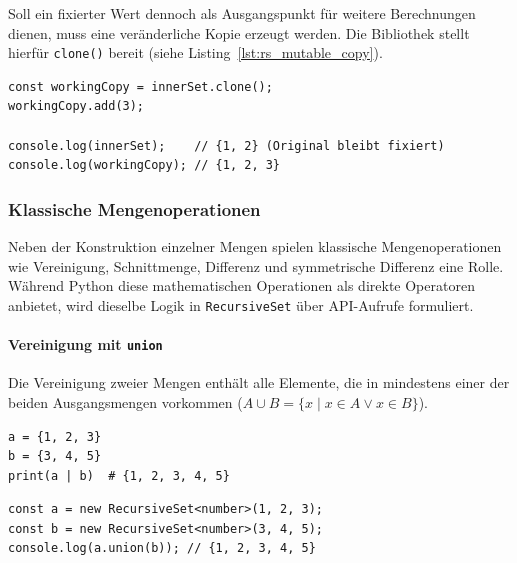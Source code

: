 Soll ein fixierter Wert dennoch als Ausgangspunkt für weitere Berechnungen dienen, muss eine veränderliche Kopie erzeugt werden. Die Bibliothek stellt hierfür \texttt{clone()} bereit (siehe Listing~\ref{lst:rs_mutable_copy}). 

\begin{listing}[ht]
    \caption{Arbeiten mit einer veränderlichen Kopie}
    \label{lst:rs_mutable_copy}
    \begin{verbatim}
const workingCopy = innerSet.clone();
workingCopy.add(3);

console.log(innerSet);    // {1, 2} (Original bleibt fixiert)
console.log(workingCopy); // {1, 2, 3}
    \end{verbatim}
\end{listing}


\subsubsection{Klassische Mengenoperationen}
\label{subsubsec:rs-api-komprehension-vs-explizit}

Neben der Konstruktion einzelner Mengen spielen klassische Mengenoperationen wie Vereinigung, Schnittmenge, Differenz und symmetrische Differenz eine Rolle. Während Python diese mathematischen Operationen als direkte Operatoren anbietet, wird dieselbe Logik in \texttt{RecursiveSet} über API-Aufrufe formuliert.

\paragraph{Vereinigung mit \texttt{union}}
Die Vereinigung zweier Mengen enthält alle Elemente, die in mindestens einer der beiden Ausgangsmengen vorkommen (\(A \cup B = \{x \mid x \in A \lor x \in B\}\)). 

\begin{listing}[ht]
    \caption{Vereinigung zweier Mengen in Python und mit \texttt{RecursiveSet}}
    \label{lst:rs_union_comparison}
    \begin{verbatim}
a = {1, 2, 3}
b = {3, 4, 5}
print(a | b)  # {1, 2, 3, 4, 5}
    \end{verbatim}
    
    
    
    \begin{verbatim}
const a = new RecursiveSet<number>(1, 2, 3);
const b = new RecursiveSet<number>(3, 4, 5);
console.log(a.union(b)); // {1, 2, 3, 4, 5}
    \end{verbatim}
\end{listing}

